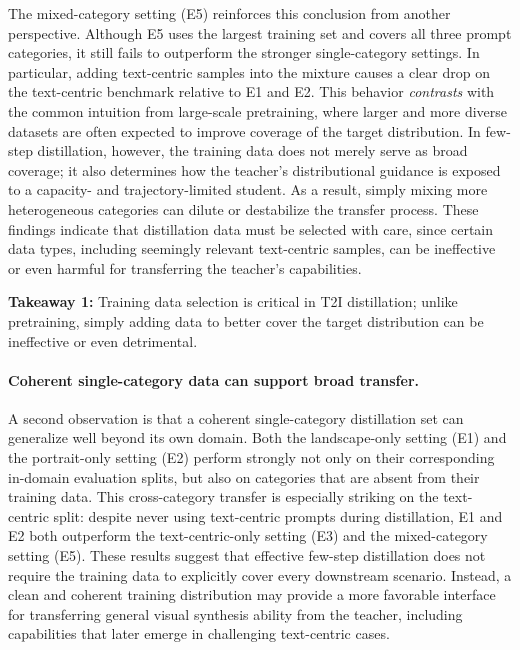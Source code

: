 \documentclass{article}
\begin{document}
The mixed-category setting (E5) reinforces this conclusion from another perspective. Although E5 uses the largest training set and covers all three prompt categories, it still fails to outperform the stronger single-category settings. In particular, adding text-centric samples into the mixture causes a clear drop on the text-centric benchmark relative to E1 and E2. This behavior \textit{contrasts} with the common intuition from large-scale pretraining, where larger and more diverse datasets are often expected to improve coverage of the target distribution. In few-step distillation, however, the training data does not merely serve as broad coverage; it also determines how the teacher's distributional guidance is exposed to a capacity- and trajectory-limited student. As a result, simply mixing more heterogeneous categories can dilute or destabilize the transfer process. These findings indicate that distillation data must be selected with care, since certain data types, including seemingly relevant text-centric samples, can be ineffective or even harmful for transferring the teacher's capabilities.

\begin{tcolorbox}[
colback=blue!3,
colframe=blue!70!black,
boxrule=0.8pt,
arc=6pt,
left=6pt,
right=6pt,
top=4pt,
bottom=4pt
]
\textbf{Takeaway 1:} Training data selection is critical in T2I distillation; unlike pretraining, simply adding data to better cover the target distribution can be ineffective or even detrimental.
\end{tcolorbox}

\paragraph{Coherent single-category data can support broad transfer.}
A second observation is that a coherent single-category distillation set can generalize well beyond its own domain. Both the landscape-only setting (E1) and the portrait-only setting (E2) perform strongly not only on their corresponding in-domain evaluation splits, but also on categories that are absent from their training data. This cross-category transfer is especially striking on the text-centric split: despite never using text-centric prompts during distillation, E1 and E2 both outperform the text-centric-only setting (E3) and the mixed-category setting (E5). These results suggest that effective few-step distillation does not require the training data to explicitly cover every downstream scenario. Instead, a clean and coherent training distribution may provide a more favorable interface for transferring general visual synthesis ability from the teacher, including capabilities that later emerge in challenging text-centric cases.
\end{document}

